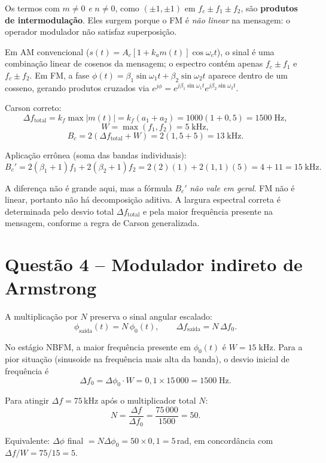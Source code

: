 \documentclass[11pt,a4paper]{article}
\begin{document}
\begin{resolucao}

Os termos com $m \neq 0$ \emph{e} $n \neq 0$, como $(\pm 1, \pm 1)$ em $f_c \pm f_1 \pm f_2$, são \textbf{produtos de intermodulação}. Eles surgem porque o FM é \emph{não linear} na mensagem: o operador modulador não satisfaz superposição.

Em AM convencional ($s(t) = A_c[1 + k_a m(t)]\cos\omega_c t$), o sinal é uma combinação linear de cosenos da mensagem; o espectro contém apenas $f_c \pm f_1$ e $f_c \pm f_2$. Em FM, a fase $\phi(t) = \beta_1\sin\omega_1 t + \beta_2\sin\omega_2 t$ aparece dentro de um cosseno, gerando produtos cruzados via $e^{j\phi} = e^{j\beta_1\sin\omega_1 t}e^{j\beta_2\sin\omega_2 t}$.
\end{resolucao}

\begin{resolucao}

Carson correto:
\[
  \Delta f_{\text{total}} = k_f \max|m(t)| = k_f(a_1 + a_2) = 1000(1 + 0{,}5) = 1500\;\text{Hz},
\]
\[
  W = \max(f_1, f_2) = 5\;\text{kHz},
\]
\[
  \boxed{B_c = 2(\Delta f_{\text{total}} + W) = 2(1{,}5 + 5) = 13\;\text{kHz}.}
\]

Aplicação errônea (soma das bandas individuais):
\[
  B_c' = 2(\beta_1 + 1)f_1 + 2(\beta_2 + 1)f_2 = 2(2)(1) + 2(1{,}1)(5) = 4 + 11 = 15\;\text{kHz}.
\]

A diferença não é grande aqui, mas a fórmula $B_c'$ \emph{não vale em geral}. FM não é linear, portanto não há decomposição aditiva. A largura espectral correta é determinada pelo desvio total $\Delta f_{\text{total}}$ e pela maior frequência presente na mensagem, conforme a regra de Carson generalizada.
\end{resolucao}

\section*{Questão 4 -- Modulador indireto de Armstrong}

\begin{resolucao}

A multiplicação por $N$ preserva o sinal angular escalado:
\[
  \phi_{\text{saída}}(t) = N\,\phi_0(t), \qquad \Delta f_{\text{saída}} = N\,\Delta f_0.
\]

No estágio NBFM, a maior frequência presente em $\phi_0(t)$ é $W = 15\;\text{kHz}$. Para a pior situação (sinusoide na frequência mais alta da banda), o desvio inicial de frequência é
\[
  \Delta f_0 = \Delta\phi_0 \cdot W = 0{,}1 \times 15{\,000} = 1500\;\text{Hz}.
\]

Para atingir $\Delta f = 75$\,kHz após o multiplicador total $N$:
\[
  N = \frac{\Delta f}{\Delta f_0} = \frac{75\,000}{1500} = \boxed{50.}
\]

Equivalente: $\Delta\phi$ final $= N \Delta\phi_0 = 50 \times 0{,}1 = 5$\,rad, em concordância com $\Delta f / W = 75/15 = 5$.
\end{resolucao}
\end{document}
